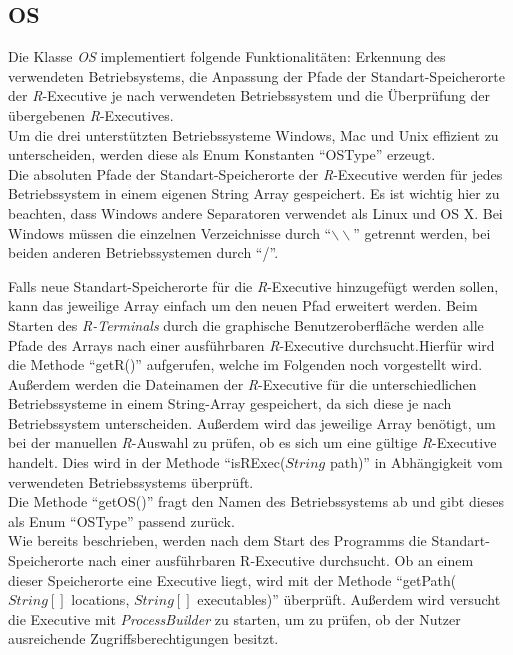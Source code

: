 \documentclass[a4paper, 12pt]{report} %
\begin{document}
\subsection{OS} \label{OS}

Die Klasse \textit{OS} implementiert folgende Funktionalitäten: Erkennung des verwendeten Betriebsystems, die Anpassung der Pfade der Standart-Speicherorte der \textit{R}-Executive je nach verwendeten Betriebssystem und die Überprüfung der übergebenen \textit{R}-Executives.\\

Um die drei unterstützten Betriebssysteme Windows, Mac und Unix effizient zu unterscheiden, werden diese als Enum Konstanten "`OSType"' erzeugt.\\

Die absoluten Pfade der Standart-Speicherorte der \textit{R}-Executive werden für jedes Betriebssystem in einem eigenen String Array gespeichert. Es ist wichtig hier zu beachten, dass Windows andere Separatoren verwendet als Linux und OS X.
Bei Windows müssen die einzelnen Verzeichnisse durch "`$\backslash \backslash$"' getrennt werden, bei beiden anderen Betriebssystemen durch "`/"'. 

Falls neue Standart-Speicherorte für die \textit{R}-Executive hinzugefügt werden sollen, kann das jeweilige Array einfach um den neuen Pfad erweitert werden. Beim Starten des \textit{R-Terminals} durch die graphische Benutzeroberfläche werden alle Pfade des Arrays nach einer ausführbaren \textit{R}-Executive durchsucht.Hierfür wird die Methode "`getR()"' aufgerufen, welche im Folgenden noch vorgestellt wird.\\

Außerdem werden die Dateinamen der \textit{R}-Executive für die unterschiedlichen Betriebssysteme in einem String-Array gespeichert, da sich diese je nach Betriebssystem unterscheiden. Außerdem wird das jeweilige Array benötigt, um bei der manuellen \textit{R}-Auswahl zu prüfen, ob es sich um eine gültige \textit{R}-Executive handelt. Dies wird in der Methode "`isRExec($String$ path)"' in Abhängigkeit vom verwendeten Betriebssystems überprüft.\\

Die Methode "`getOS()"' fragt den Namen des Betriebssystems ab und gibt dieses als Enum "`OSType"' passend zurück.\\

Wie bereits beschrieben, werden nach dem Start des Programms die Standart-Speicherorte nach einer ausführbaren R-Executive durchsucht. Ob an einem dieser Speicherorte eine Executive liegt, wird mit der Methode "`getPath($String[]$ locations, $String[]$ executables)"' überprüft. Außerdem wird versucht die Executive mit \textit{ProcessBuilder} zu starten, um zu prüfen, ob der Nutzer ausreichende Zugriffsberechtigungen besitzt.\\
\end{document}
